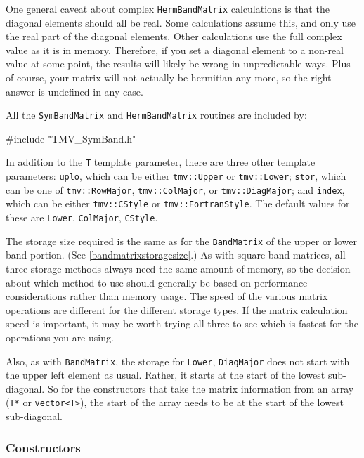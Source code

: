 \documentclass[twoside,letterpaper,11pt]{article}
\renewcommand{\tt}[1]{{\lstinline {#1}}}
\begin{document}
One general caveat about complex \tt{HermBandMatrix} calculations is that 
the diagonal elements should all be real.  Some calculations assume this, and 
only use the real part of the diagonal elements.  Other calculations use the 
full complex value as it is in memory.  Therefore, if you set a diagonal element
to a non-real value at some point, the results will likely be wrong in 
unpredictable ways.  Plus of course, your matrix will not actually be 
hermitian any more, so the right answer is undefined in any case.

All the \tt{SymBandMatrix} and \tt{HermBandMatrix} routines are included by:
\begin{tmvcode}
#include "TMV_SymBand.h"
\end{tmvcode}

In addition to the \tt{T} template parameter, there are three other template 
parameters: \tt{uplo}, which can be either \tt{tmv::Upper} or \tt{tmv::Lower};
\tt{stor}, which can be one of \tt{tmv::RowMajor}, \tt{tmv::ColMajor}, or 
\tt{tmv::DiagMajor}; and \tt{index}, which can be either \tt{tmv::CStyle}
or \tt{tmv::FortranStyle}.  The default values for these are 
\tt{Lower}, \tt{ColMajor}, \tt{CStyle}.

The storage size required is the same as for the \tt{BandMatrix} of
the upper or lower band portion.
(See \ref{bandmatrixstoragesize}.)
As with square band matrices, 
all three storage methods always need the same amount of memory, so the 
decision about which method to use should generally be based on performance 
considerations rather than memory usage.
The speed of the various matrix operations are different for the different storage 
types.  If the matrix calculation speed is important, it may be worth trying 
all three to see which is fastest for the operations you are using.

Also, as with \tt{BandMatrix}, the storage for \tt{Lower}, \tt{DiagMajor} 
does not start with the upper left element as usual.
Rather, it starts at the start of the lowest sub-diagonal.  
So for the constructors that 
take the matrix information from an array (\tt{T*} or \tt{vector<T>}), 
the start of the array needs to be at the start of the lowest sub-diagonal.  

\subsubsection{Constructors}
\end{document}
